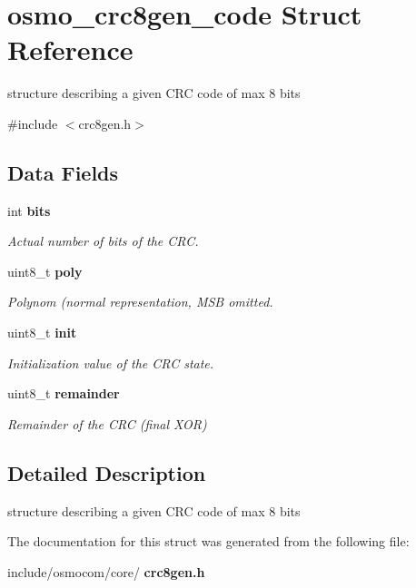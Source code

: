 \section{osmo\+\_\+crc8gen\+\_\+code Struct Reference}
\label{structosmo__crc8gen__code}


structure describing a given C\+RC code of max 8 bits  




{\ttfamily \#include $<$crc8gen.\+h$>$}

\subsection*{Data Fields}
\begin{DoxyCompactItemize}
\item 
\mbox{\label{structosmo__crc8gen__code_a9a2de2bd7a3809d82b83a25641129520}} 
int \textbf{ bits}
\begin{DoxyCompactList}\small\item\em Actual number of bits of the C\+RC. \end{DoxyCompactList}\item 
\mbox{\label{structosmo__crc8gen__code_a40cbd268cfea5c97f8380def8fd7baf2}} 
uint8\+\_\+t \textbf{ poly}
\begin{DoxyCompactList}\small\item\em Polynom (normal representation, M\+SB omitted. \end{DoxyCompactList}\item 
\mbox{\label{structosmo__crc8gen__code_ade3db78e0cda5fdae402c734d5977f1f}} 
uint8\+\_\+t \textbf{ init}
\begin{DoxyCompactList}\small\item\em Initialization value of the C\+RC state. \end{DoxyCompactList}\item 
\mbox{\label{structosmo__crc8gen__code_afe19aa4b075e3438d90c7ba46542d779}} 
uint8\+\_\+t \textbf{ remainder}
\begin{DoxyCompactList}\small\item\em Remainder of the C\+RC (final X\+OR) \end{DoxyCompactList}\end{DoxyCompactItemize}


\subsection{Detailed Description}
structure describing a given C\+RC code of max 8 bits 

The documentation for this struct was generated from the following file\+:\begin{DoxyCompactItemize}
\item 
include/osmocom/core/\textbf{ crc8gen.\+h}\end{DoxyCompactItemize}
